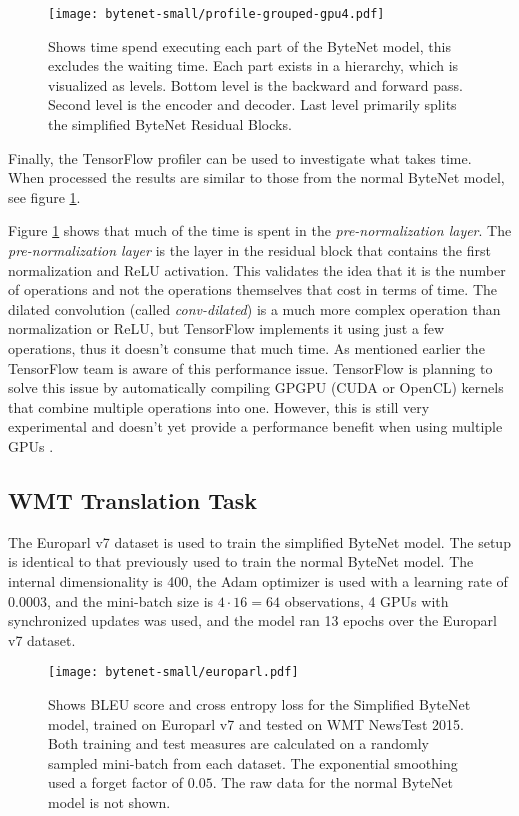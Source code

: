 \begin{figure}[h]
    \centering
    \texttt{[image: bytenet-small/profile-grouped-gpu4.pdf]}
    \caption{Shows time spend executing each part of the ByteNet model, this excludes the waiting time. Each part exists in a hierarchy, which is visualized as levels. Bottom level is the backward and forward pass. Second level is the encoder and decoder. Last level primarily splits the simplified ByteNet Residual Blocks.}
    \label{fig:result:simple-bytenet:profile-grouped}
\end{figure}

Finally, the TensorFlow profiler can be used to investigate what takes time. When processed the results are similar to those from the normal ByteNet model, see figure \ref{fig:result:simple-bytenet:profile-grouped}.

Figure \ref{fig:result:simple-bytenet:profile-grouped} shows that much of the time is spent in the \textit{pre-normalization layer}. The \textit{pre-normalization layer} is the layer in the residual block that contains the first normalization and ReLU activation. This validates the idea that it is the number of operations and not the operations themselves that cost in terms of time. The dilated convolution (called \textit{conv-dilated}) is a much more complex operation than normalization or ReLU, but TensorFlow implements it using just a few operations, thus it doesn't consume that much time. As mentioned earlier the TensorFlow team is aware of this performance issue. TensorFlow is planning to solve this issue by automatically compiling GPGPU (CUDA or OpenCL) kernels that combine multiple operations into one. However, this is still very experimental and doesn't yet provide a performance benefit when using multiple GPUs \cite{google-xla}.

\clearpage
\subsection{WMT Translation Task}

The Europarl v7 dataset is used to train the simplified ByteNet model. The setup is identical to that previously used to train the normal ByteNet model. The internal dimensionality is 400, the Adam optimizer is used with a learning rate of 0.0003, and the mini-batch size is $4 \cdot 16 = 64$ observations, 4 GPUs with synchronized updates was used, and the model ran 13 epochs over the Europarl v7 dataset.

\begin{figure}[h]
    \centering
    \texttt{[image: bytenet-small/europarl.pdf]}
    \caption{Shows BLEU score and cross entropy loss for the Simplified ByteNet model, trained on Europarl v7 and tested on WMT NewsTest 2015. Both training and test measures are calculated on a randomly sampled mini-batch from each dataset. The exponential smoothing used a forget factor of $0.05$. The raw data for the normal ByteNet model is not shown.}
    \label{fig:result:bytenet-small:europarl}
\end{figure}

